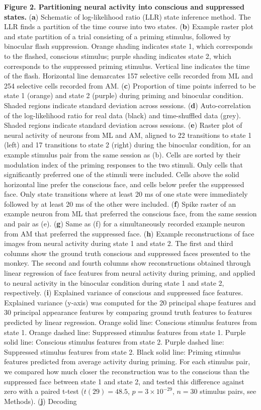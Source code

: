 \documentclass{article}
\begin{document}
\noindent\textbf{Figure 2. Partitioning neural activity into conscious and suppressed states.} (\textbf{a}) Schematic of log-likelihood ratio (LLR) state inference method. The LLR finds a partition of the time course into two states. (\textbf{b}) Example raster plot and state partition of a trial consisting of a priming stimulus, followed by binocular flash suppression. Orange shading indicates state 1, which corresponds to the flashed, conscious stimulus; purple shading indicates state 2, which corresponds to the suppressed priming stimulus. Vertical line indicates the time of the flash. Horizontal line demarcates 157 selective cells recorded from ML and 254 selective cells recorded from AM. (\textbf{c}) Proportion of time points inferred to be state 1 (orange) and state 2 (purple) during priming and binocular condition. Shaded regions indicate standard deviation across sessions. (\textbf{d}) Auto-correlation of the log-likelihood ratio for real data (black) and time-shuffled data (grey). Shaded regions indicate standard deviation across sessions. (\textbf{e}) Raster plot of neural activity of neurons from ML and AM, aligned to 22 transitions to state 1 (left) and 17 transitions to state 2 (right) during the binocular condition, for an example stimulus pair from the same session as (b). Cells are sorted by their modulation index of the priming responses to the two stimuli. Only cells that significantly preferred one of the stimuli were included. Cells above the solid horizontal line prefer the conscious face, and cells below prefer the suppressed face. Only state transitions where at least 20 ms of one state were immediately followed by at least 20 ms of the other were included. (\textbf{f}) Spike raster of an example neuron from ML that preferred the conscious face, from the same session and pair as (e). (\textbf{g}) Same as (f) for a simultaneously recorded example neuron from AM that preferred the suppressed face. (\textbf{h}) Example reconstructions of face images from neural activity during state 1 and state 2. The first and third columns show the ground truth conscious and suppressed faces presented to the monkey. The second and fourth columns show reconstructions obtained through linear regression of face features from neural activity during priming, and applied to neural activity in the binocular condition during state 1 and state 2, respectively. (\textbf{i}) Explained variance of conscious and suppressed face features. Explained variance (y-axis) was computed for the 20 principal shape features and 30 principal appearance features by comparing ground truth features to features predicted by linear regression. Orange solid line: Conscious stimulus features from state 1. Orange dashed line: Suppressed stimulus features from state 1. Purple solid line: Conscious stimulus features from state 2. Purple dashed line: Suppressed stimulus features from state 2. Black solid line: Priming stimulus features predicted from average activity during priming. For each stimulus pair, we compared how much closer the reconstruction was to the conscious than the suppressed face between state 1 and state 2, and tested this difference against zero with a paired t-test ($t(29) = 48.5$, $p = 3 \times 10^{-29}$, $n = 30$ stimulus pairs, see Methods). (\textbf{j}) Decoding 
\end{document}

